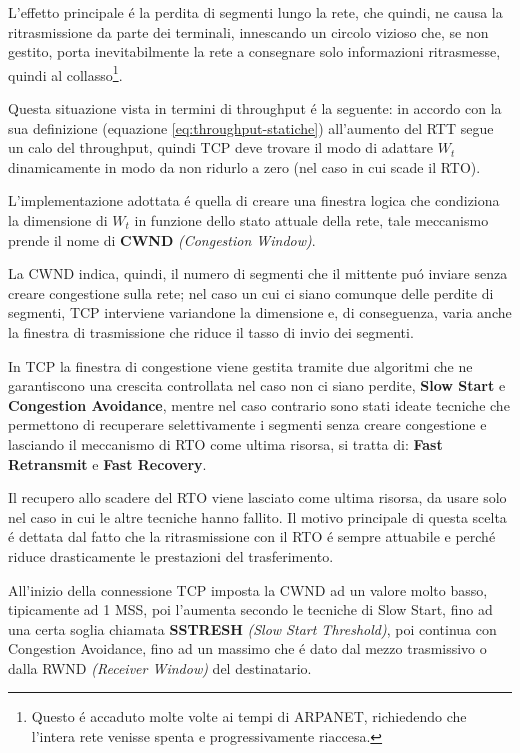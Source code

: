 \documentclass[12pt]{article}
\begin{document}
L'effetto principale \'e la perdita di segmenti lungo la rete, che quindi, ne causa la ritrasmissione da parte dei 
terminali, innescando un circolo vizioso che, se non gestito, porta inevitabilmente la rete a consegnare solo 
informazioni ritrasmesse, quindi al collasso\footnote{Questo \'e accaduto molte volte ai tempi di ARPANET, 
richiedendo che l'intera rete venisse spenta e progressivamente riaccesa.}.

Questa situazione vista in termini di throughput \'e la seguente: in accordo con la sua definizione (equazione 
\ref{eq:throughput-statiche}) all'aumento del RTT segue un calo del throughput, quindi TCP deve trovare il modo di 
adattare $W_t$ dinamicamente in modo da non ridurlo a zero (nel caso in cui scade il RTO).

L'implementazione adottata \'e quella di creare una finestra logica che condiziona la dimensione di $W_t$ in funzione 
dello stato attuale della rete, tale meccanismo prende il nome di \textbf{CWND} \textit{(Congestion Window)}.

La CWND indica, quindi, il numero di segmenti che il mittente pu\'o inviare senza creare congestione sulla rete; 
nel caso un cui ci siano comunque delle perdite di segmenti, TCP interviene variandone la dimensione e, di 
conseguenza, varia anche la finestra di trasmissione che riduce il tasso di invio dei segmenti.

In TCP la finestra di congestione viene gestita tramite due algoritmi che ne garantiscono una crescita 
controllata nel caso non ci siano perdite, \textbf{Slow Start} e \textbf{Congestion Avoidance}, mentre nel caso 
contrario sono stati ideate tecniche che permettono di recuperare selettivamente i segmenti senza creare 
congestione e lasciando il meccanismo di RTO come ultima risorsa, si tratta di: \textbf{Fast Retransmit} e 
\textbf{Fast Recovery}.

Il recupero allo scadere del RTO viene lasciato come ultima risorsa, da usare solo nel caso in cui le altre tecniche 
hanno fallito. Il motivo principale di questa scelta \'e dettata dal fatto che la ritrasmissione con il RTO \'e 
sempre attuabile e perch\'e riduce drasticamente le prestazioni del trasferimento.

All'inizio della connessione TCP imposta la CWND ad un valore molto basso, tipicamente ad 1 MSS, poi l'aumenta 
secondo le tecniche di Slow Start, fino ad una certa soglia chiamata \textbf{SSTRESH} \textit{(Slow Start 
Threshold)}, poi continua con Congestion Avoidance, fino ad un massimo che \'e dato dal mezzo trasmissivo o dalla 
RWND \textit{(Receiver Window)} del destinatario.
\end{document}
